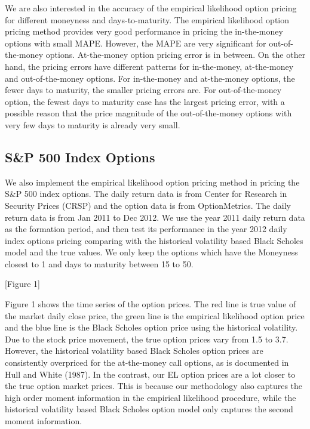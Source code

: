 We are also interested in the accuracy of the empirical likelihood option pricing for different moneyness and days-to-maturity. The empirical likelihood option pricing method provides very good performance in pricing the in-the-money options with small MAPE. However, the MAPE are very significant for out-of-the-money options. At-the-money option pricing error is in between. On the other hand, the pricing errors have different patterns for in-the-money, at-the-money and out-of-the-money options. For in-the-money and at-the-money options, the fewer days to maturity, the smaller pricing errors are. For out-of-the-money option, the fewest days to maturity case has the largest pricing error, with a possible reason that the price magnitude of the out-of-the-money options with very few days to maturity is already very small.  

\subsection{S\&P 500 Index Options}

We also implement the empirical likelihood option pricing method in pricing the S\&P 500 index options. The daily return data is from Center for Research in Security Prices (CRSP) and the option data is from OptionMetrics. The daily return data is from Jan 2011 to Dec 2012. We use the year 2011 daily return data as the formation period, and then test its performance in the year 2012 daily index options pricing comparing with the historical volatility based Black Scholes model and the true values. We only keep the options which have the Moneyness closest to 1 and days to maturity between 15 to 50. 
\begin{center}
[Figure 1]
\end{center}

Figure 1 shows the time series of the option prices. The red line is true value of the market daily close price, the green line is the empirical likelihood option price and the blue line is the Black Scholes option price using the historical volatility. Due to the stock price movement, the true option prices vary from 1.5 to 3.7. However, the historical volatility based Black Scholes option prices are consistently overpriced for the at-the-money call options, as is documented in Hull and White (1987).  In the contrast, our EL option prices are a lot closer to the true option market prices. This is because our methodology also captures the high order moment information in the empirical likelihood procedure, while the historical volatility based Black Scholes option model only captures the second moment information.   


